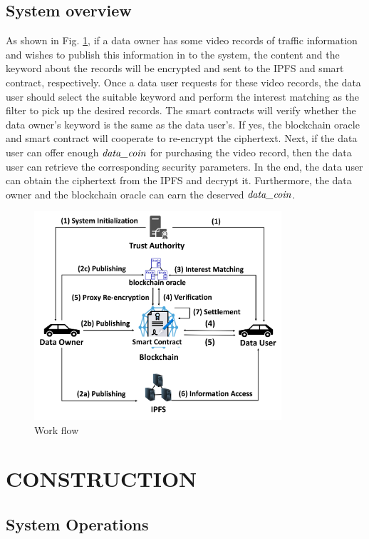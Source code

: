 \documentclass[journal]{IEEEtran}
\begin{document}
    \subsection{System overview} 
    
    As shown in Fig. \ref{fig:work_flow}, if a data owner has some video records of traffic information and wishes to publish this information in to the system, the content and the keyword about the records will be encrypted and sent to the IPFS and smart contract, respectively. Once a data user requests for these video records, the data user should select the suitable keyword and perform the interest matching as the filter to pick up the desired records. The smart contracts will verify  whether the data owner's keyword is the same as the data user's. If yes, the blockchain oracle and smart contract will cooperate to re-encrypt the ciphertext. Next, if the data user can offer enough $\emph{data\_coin}$ for purchasing the video record, then the data user can retrieve the corresponding security parameters. In the end, the data user can  obtain the ciphertext from the IPFS and decrypt it. Furthermore, the data owner and the blockchain oracle can earn the deserved $\emph{data\_coin}$.  

\begin{figure}[h]
    \centering
    \includegraphics[width=260pt]{picture/flow2.png}
    \caption{Work flow}
    \label{fig:work_flow}
\end{figure}

    \section{CONSTRUCTION}

    \subsection{System Operations}
    
\end{document}
